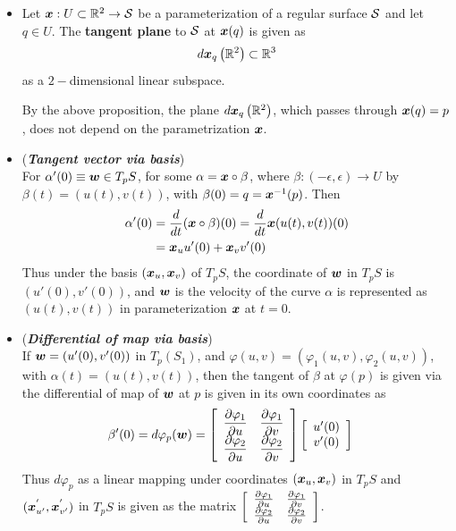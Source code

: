 \documentclass[11pt]{article}
\begin{document}
\begin{itemize}
\item \begin{proposition}\label{prop: tang_param}
Let $\boldsymbol{x}: U\subset {\mathbb R}^{2} \rightarrow {\mathcal S}$ be a parameterization of a regular surface ${\mathcal S}$ and let $q\in U$. The \textbf{tangent plane} to ${\mathcal S}$ at $\boldsymbol{x}(q)$ is given as 
\begin{align*}
d\boldsymbol{x}_{q}\left({\mathbb R}^{2}\right) \subset {\mathbb R}^{3}
\end{align*} as a $2-$dimensional linear subspace.
\end{proposition}  By the above proposition, the plane $d\boldsymbol{x}_{q}\left({\mathbb R}^{2}\right)$, which passes through $\boldsymbol{x}(q) = p$, does not depend on the parametrization $\boldsymbol{x}$. 

\item (\emph{\textbf{Tangent vector via basis}})\\
 For $\alpha'(0)\equiv \boldsymbol{w} \in T_{p}S$, for some $\alpha = \boldsymbol{x}\circ  \beta$, where $\beta: (-\epsilon, \epsilon) \rightarrow U$ by $\beta(t) = (u(t), v(t))$, with $\beta(0) = q = \boldsymbol{x}^{-1}(p)$. Then 
\begin{align}
\alpha'(0)&= \frac{d}{dt}(\boldsymbol{x}\circ \beta)(0) = \frac{d}{dt}\boldsymbol{x}(u(t), v(t))(0)\\
&=\boldsymbol{x}_{u}u'(0) + \boldsymbol{x}_{v}v'(0) \label{eqn: tangent_line_coord}
\end{align} 
Thus under the basis $(\boldsymbol{x}_{u}, \boldsymbol{x}_{v})$ of $T_{p}S$, the coordinate of $\boldsymbol{w}$ in $T_{p}S$ is $(u'(0), v'(0))$, and $\boldsymbol{w}$ is the velocity of  the curve $\alpha$ is represented as $(u(t), v(t))$ in parameterization $\boldsymbol{x}$ at $t=0$. 

\item (\emph{\textbf{Differential of map via basis}})\\
 If $\boldsymbol{w} = (u'(0), v'(0))$ in $T_{p}(S_{1})$,  and $\varphi(u,v) = (\varphi_{1}(u,v), \varphi_{2}(u,v))$, with $\alpha(t) = (u(t), v(t))$, then the tangent of $\beta$ at $\varphi(p)$ is given via the differential of map of $\boldsymbol{w}$ at $p$ is given in its own coordinates as 
\begin{align}
 \beta'(0)= d\varphi_{p}(\boldsymbol{w}) &= \left[\begin{array}{cc}
 \dfrac{\partial \varphi_{1}}{ \partial u} & \dfrac{\partial \varphi_{1}}{ \partial v} \\ 
 \dfrac{\partial \varphi_{2}}{ \partial u} & \dfrac{\partial \varphi_{2}}{ \partial v}
 \end{array} \right] \left[\begin{array}{c}
 u'(0) \\ 
 v'(0)
 \end{array} \right] \label{eqn: diff_map_coord}
\end{align}
Thus $d\varphi_{p}$ as a linear mapping under coordinates $(\boldsymbol{x}_{u}, \boldsymbol{x}_{v})$ in $T_{p}S$ and $(\boldsymbol{x}^{'}_{u'}, \boldsymbol{x}^{'}_{v'})$ in $T_{p}S$ is given as the matrix $\left[\begin{array}{cc}
 \frac{\partial \varphi_{1}}{ \partial u} & \frac{\partial \varphi_{1}}{ \partial v} \\ 
 \frac{\partial \varphi_{2}}{ \partial u} & \frac{\partial \varphi_{2}}{ \partial v}
 \end{array} \right] $.


\end{itemize}
\end{document}
